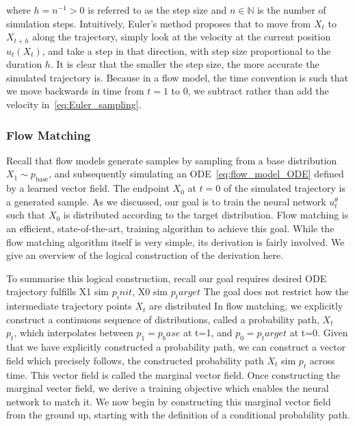 \documentclass[12pt,a4paper]{report}
\begin{document}
where $h = n^{-1} > 0$ is referred to as the step size and $n \in \mathbb{N}$ is the number of simulation steps. 
Intuitively, Euler's method proposes that to move from $X_t$ to $X_{t+h}$ along the trajectory, simply look at the velocity at the current position $u_t(X_t)$, and take a step in that direction, with step size proportional to the duration $h$. 
It is clear that the smaller the step size, the more accurate the simulated trajectory is. 
Because in a flow model, the time convention is such that we move backwards in time from $t=1$ to $0$, we subtract rather than add the velocity in~\ref{eq:Euler_sampling}. 

\subsubsection{Flow Matching}
Recall that flow models generate samples by sampling from a base distribution $X_1 \sim p_\text{base}$, and subsequently simulating an ODE~\ref{eq:flow_model_ODE} defined by a learned vector field. The endpoint $X_0$ at $t=0$ of the simulated trajectory is a generated sample. 
As we discussed, our goal is to train the neural network $u_t^\theta$ such that $X_0$ is distributed according to the target distribution. 
Flow matching is an efficient, state-of-the-art, training algorithm to achieve this goal.
While the flow matching algorithm itself is very simple, its derivation is fairly involved. 
We give an overview of the logical construction of the derivation here. 

To summarise this logical construction, recall our goal requires desired ODE trajectory fulfills X1 sim $p_init$, X0 sim $p_target$
The goal does not restrict how the intermediate trajectory points $X_t$ are distributed
In flow matching, we explicitly construct a continuous sequence of distributions, called a probability path, $X_t$ ~ $p_t$, which interpolates between $p_1 = p_base$ at t=1, and $p_0 = p_target$ at t=0. 
Given that we have explicitly constructed a probability path, we can construct a vector field which precisely follows, the constructed probability path $X_t$ sim $p_t$ across time. This vector field is called the marginal vector field. 
Once constructing the marginal vector field, we derive a training objective which enables the neural network to match it. 
We now begin by constructing this marginal vector field from the ground up, starting with the definition of a conditional probability path. 
\end{document}

